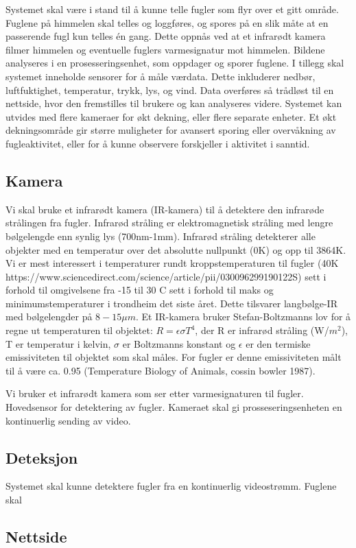 Systemet skal være i stand til å kunne telle fugler som flyr over et gitt område. Fuglene på himmelen skal telles og loggføres, og spores på en slik måte at en passerende fugl kun telles én gang. Dette oppnås ved at et infrarødt kamera filmer himmelen og eventuelle fuglers varmesignatur mot himmelen. Bildene analyseres i en prosesseringsenhet, som oppdager og sporer fuglene. I tillegg skal systemet inneholde sensorer for å måle værdata. Dette inkluderer nedbør, luftfuktighet, temperatur, trykk, lys, og vind. Data overføres så trådløst til en nettside, hvor den fremstilles til brukere og kan analyseres videre. Systemet kan utvides med flere kameraer for økt dekning, eller flere separate enheter. Et økt dekningsområde gir større muligheter for avansert sporing eller overvåkning av fugleaktivitet, eller for å kunne observere forskjeller i aktivitet i sanntid.




\subsection{Kamera}

Vi skal bruke et infrarødt kamera (IR-kamera) til å detektere den infrarøde strålingen fra fugler. Infrarød stråling er elektromagnetisk stråling med lengre bølgelengde enn synlig lys (700nm-1mm). Infrarød stråling detekterer alle objekter med en temperatur over det absolutte nullpunkt (0K) og opp til 3864K. Vi er mest interessert i temperaturer rundt kroppstemperaturen til fugler (40K https://www.sciencedirect.com/science/article/pii/030096299190122S) sett i forhold til omgivelsene fra -15 til 30 C sett i forhold til maks og minimumstemperaturer i trondheim det siste året. Dette tilsvarer langbølge-IR med bølgelengder på $8-15\mu m$. Et IR-kamera bruker Stefan-Boltzmanns lov for å regne ut temperaturen til objektet: $R=\epsilon \sigma T^4$, der R er infrarød stråling (W/$m^2$), T er temperatur i kelvin, $\sigma$ er Boltzmanns konstant og $\epsilon$ er den termiske emissiviteten til objektet som skal måles. For fugler er denne emissiviteten målt til å være ca. 0.95 (Temperature Biology
of Animals, cossin bowler 1987). 


Vi bruker et infrarødt kamera som ser etter varmesignaturen til fugler. Hovedsensor for detektering av fugler. Kameraet skal gi prosseseringsenheten en kontinuerlig sending av video.


\subsection{Deteksjon}
Systemet skal kunne detektere fugler fra en kontinuerlig videostrømm. Fuglene skal 



\subsection{Nettside}


